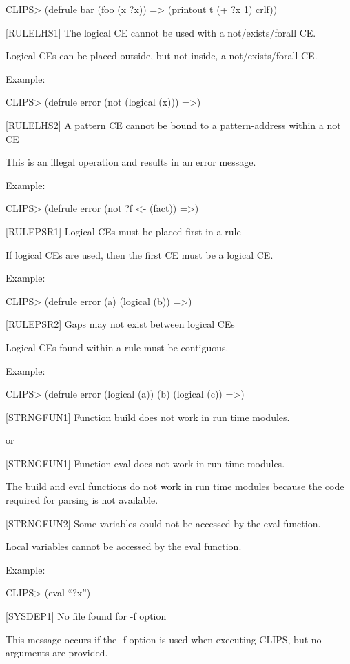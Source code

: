 \documentclass[letterpaper,10pt,english]{sphinxmanual}
\begin{document}
CLIPS\textgreater{} (defrule bar (foo (x ?x)) =\textgreater{} (printout t (+ ?x 1) crlf))

{[}RULELHS1{]} The logical CE cannot be used with a not/exists/forall CE.

Logical CEs can be placed outside, but not inside, a not/exists/forall
CE.

Example:

CLIPS\textgreater{} (defrule error (not (logical (x))) =\textgreater{})

{[}RULELHS2{]} A pattern CE cannot be bound to a pattern-address within a
not CE

This is an illegal operation and results in an error message.

Example:

CLIPS\textgreater{} (defrule error (not ?f \textless{}- (fact)) =\textgreater{})

{[}RULEPSR1{]} Logical CEs must be placed first in a rule

If logical CEs are used, then the first CE must be a logical CE.

Example:

CLIPS\textgreater{} (defrule error (a) (logical (b)) =\textgreater{})

{[}RULEPSR2{]} Gaps may not exist between logical CEs

Logical CEs found within a rule must be contiguous.

Example:

CLIPS\textgreater{} (defrule error (logical (a)) (b) (logical (c)) =\textgreater{})

{[}STRNGFUN1{]} Function build does not work in run time modules.

or

{[}STRNGFUN1{]} Function eval does not work in run time modules.

The build and eval functions do not work in run time modules because the
code required for parsing is not available.

{[}STRNGFUN2{]} Some variables could not be accessed by the eval function.

Local variables cannot be accessed by the eval function.

Example:

CLIPS\textgreater{} (eval “?x”)

{[}SYSDEP1{]} No file found for -f option

This message occurs if the -f option is used when executing CLIPS, but
no arguments are provided.
\end{document}
